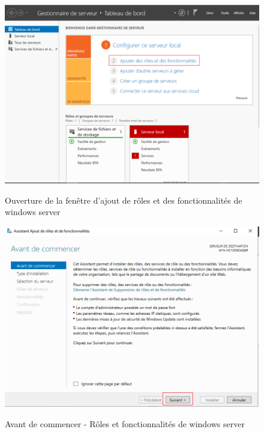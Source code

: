 \begin{figure}[h!]
	\begin{center}
		\caption{Ouverture de la fenêtre d'ajout de rôles et des fonctionnalités de windows server}
		\includegraphics[scale=0.7]{WS_Screenshots/29.png}
		\label{Funcs_WinS/1}
	\end{center}
\end{figure}
\FloatBarrier
    

\begin{figure}[h!]
	\begin{center}
		\caption{Avant de commencer - Rôles et fonctionnalités de windows server}
		\includegraphics[scale=0.7]{WS_Screenshots/30.png}
		\label{Funcs_WinS/2}
	\end{center}
\end{figure}
\FloatBarrier 
    


